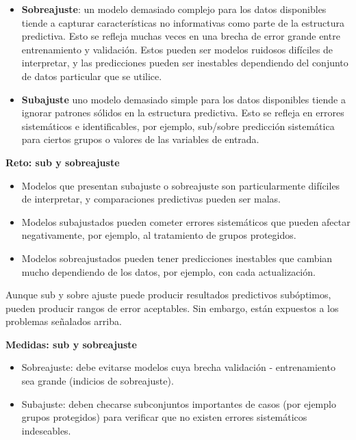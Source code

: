 \documentclass[
]{book}
\providecommand{\tightlist}{%
  \setlength{\itemsep}{0pt}\setlength{\parskip}{0pt}}
\let\BeginKnitrBlock\begin \let\EndKnitrBlock\end
\begin{document}
\begin{itemize}
\item
  \textbf{Sobreajuste}: un modelo demasiado complejo para los datos disponibles tiende a capturar características no informativas como parte de la estructura predictiva. Esto se refleja muchas veces en una brecha de error grande entre entrenamiento y validación. Estos pueden ser modelos ruidosos difíciles de interpretar, y las predicciones pueden ser inestables dependiendo del conjunto de datos particular que se utilice.
\item
  \textbf{Subajuste} uno modelo demasiado simple para los datos disponibles tiende a ignorar patrones sólidos en la estructura predictiva. Esto se refleja en errores sistemáticos e identificables, por ejemplo, sub/sobre predicción sistemática para ciertos grupos o valores de las variables de entrada.
\end{itemize}

\BeginKnitrBlock{rmdnote}
\textbf{Reto: sub y sobreajuste}

\begin{itemize}
\tightlist
\item
  Modelos que presentan subajuste o sobreajuste son particularmente difíciles de interpretar, y comparaciones predictivas pueden ser malas.
\item
  Modelos subajustados pueden cometer errores sistemáticos que pueden afectar negativamente, por ejemplo, al tratamiento de grupos protegidos.
\item
  Modelos sobreajustados pueden tener predicciones inestables que cambian mucho dependiendo de los datos, por ejemplo, con cada actualización.
\end{itemize}
\EndKnitrBlock{rmdnote}

Aunque sub y sobre ajuste puede producir resultados predictivos subóptimos, pueden producir rangos de error aceptables. Sin embargo, están expuestos a los problemas señalados arriba.

\BeginKnitrBlock{rmdtip}
\textbf{Medidas: sub y sobreajuste}

\begin{itemize}
\tightlist
\item
  Sobreajuste: debe evitarse modelos cuya brecha validación - entrenamiento sea grande (indicios de sobreajuste).
\item
  Subajuste: deben checarse subconjuntos importantes de casos (por ejemplo grupos protegidos) para verificar que no existen errores sistemáticos indeseables.
\end{itemize}
\EndKnitrBlock{rmdtip}
\end{document}
